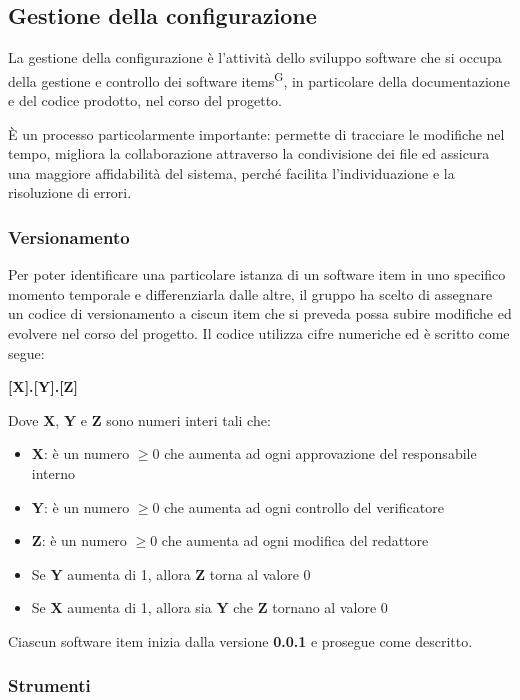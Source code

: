 \subsection{Gestione della configurazione}\label{sec:processi_di_supporto:gestione_configurazione}
La gestione della configurazione è l'attività dello sviluppo software che si occupa della gestione e controllo dei software items\textsuperscript{G}, in particolare della documentazione e del codice prodotto, nel corso del progetto.
\par È un processo particolarmente importante: permette di tracciare le modifiche nel tempo, migliora la collaborazione attraverso la condivisione dei file ed assicura una maggiore affidabilità del sistema, perché facilita l'individuazione e la risoluzione di errori.
\subsubsection{Versionamento}
Per poter identificare una particolare istanza di un software item in uno specifico momento temporale e differenziarla dalle altre, il gruppo ha scelto di assegnare un codice di versionamento a ciscun item che si preveda possa subire modifiche ed evolvere nel corso del progetto. Il codice utilizza cifre numeriche ed è scritto come segue:
\begin{center}
    \textbf{[X].[Y].[Z]}
\end{center}
Dove \textbf{X}, \textbf{Y} e \textbf{Z} sono numeri interi tali che:
\begin{itemize}
    \item \textbf{X}: è un numero $ \geq 0 $ che aumenta ad ogni approvazione del responsabile interno
    \item \textbf{Y}: è un numero $ \geq 0 $ che aumenta ad ogni controllo del verificatore
    \item \textbf{Z}: è un numero $ \geq 0 $ che aumenta ad ogni modifica del redattore
    \item Se \textbf{Y} aumenta di 1, allora \textbf{Z} torna al valore 0
    \item Se \textbf{X} aumenta di 1, allora sia \textbf{Y} che \textbf{Z} tornano al valore 0
\end{itemize}
Ciascun software item inizia dalla versione \textbf{0.0.1} e prosegue come descritto.
\subsubsection{Strumenti}
